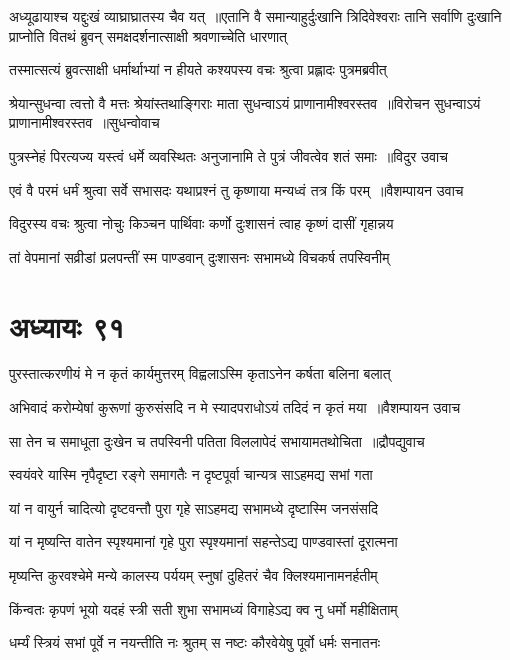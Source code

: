 अध्यूढायाश्च यद्दुःखं व्याघ्राघ्रातस्य चैव यत् ॥एतानि वै समान्याहुर्दुःखानि त्रिदिवेश्वराः
\twolineshloka
{तानि सर्वाणि दुःखानि प्राप्नोति वितथं ब्रुवन्}
{समक्षदर्शनात्साक्षी श्रवणाच्चेति धारणात्}


\twolineshloka
{तस्मात्सत्यं ब्रुवत्साक्षी धर्मार्थाभ्यां न हीयते}
{कश्यपस्य वचः श्रुत्वा प्रह्लादः पुत्रमब्रवीत्}


\threelineshloka
{श्रेयान्सुधन्वा त्वत्तो वै मत्तः श्रेयांस्तथाङ्गिराः}
{माता सुधन्वाऽयं प्राणानामीश्वरस्तव ॥विरोचन सुधन्वाऽयं प्राणानामीश्वरस्तव ॥सुधन्वोवाच}
{}


\threelineshloka
{पुत्रस्नेहं पिरत्यज्य यस्त्वं धर्मे व्यवस्थितः}
{अनुजानामि ते पुत्रं जीवत्वेव शतं समाः ॥विदुर उवाच}
{}


\twolineshloka
{एवं वै परमं धर्मं श्रुत्वा सर्वे सभासदः}
{यथाप्रश्नं तु कृष्णाया मन्यध्वं तत्र किं परम् ॥वैशम्पायन उवाच}


\twolineshloka
{विदुरस्य वचः श्रुत्वा नोचुः किञ्चन पार्थिवाः}
{कर्णो दुःशासनं त्वाह कृष्णं दासीं गृहान्नय}


\twolineshloka
{तां वेपमानां सव्रीडां प्रलपन्तीं स्म पाण्डवान्}
{दुःशासनः सभामध्ये विचकर्ष तपस्विनीम्}


\chapter{अध्यायः ९१}
\twolineshloka
{पुरस्तात्करणीयं मे न कृतं कार्यमुत्तरम्}
{विह्वलाऽस्मि कृताऽनेन कर्षता बलिना बलात्}


\twolineshloka
{अभिवादं करोम्येषां कुरूणां कुरुसंसदि}
{न मे स्यादपराधोऽयं तदिदं न कृतं मया ॥वैशम्पायन उवाच}


\threelineshloka
{सा तेन च समाधूता दुःखेन च तपस्विनी}
{पतिता विललापेदं सभायामतथोचिता ॥द्रौपद्युवाच}
{}


\twolineshloka
{स्वयंवरे यास्मि नृपैदृष्टा रङ्गे समागतैः}
{न दृष्टपूर्वा चान्यत्र साऽहमद्य सभां गता}


\twolineshloka
{यां न वायुर्न चादित्यो दृष्टवन्तौ पुरा गृहे}
{साऽहमद्य सभामध्ये दृष्टास्मि जनसंसदि}


\twolineshloka
{यां न मृष्यन्ति वातेन स्पृश्यमानां गृहे पुरा}
{स्पृश्यमानां सहन्तेऽद्य पाण्डवास्तां दूरात्मना}


\twolineshloka
{मृष्यन्ति कुरवश्चेमे मन्ये कालस्य पर्ययम्}
{स्नुषां दुहितरं चैव क्लिश्यमानामनर्हतीम्}


\twolineshloka
{किंन्वतः कृपणं भूयो यदहं स्त्री सती शुभा}
{सभामध्यं विगाहेऽद्य क्व नु धर्मो महीक्षिताम्}


\twolineshloka
{धर्म्यं स्त्रियं सभां पूर्वे न नयन्तीति नः श्रुतम्}
{स नष्टः कौरवेयेषु पूर्वो धर्मः सनातनः}


